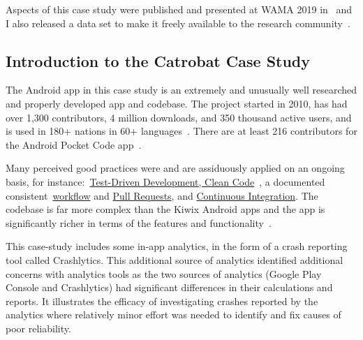 Aspects of this case study were published and presented at WAMA 2019 in~\citep{harty_better_android_apps_using_android_vitals} and I also released a data set to make it freely available to the research community~\citep{harty_wama_dataset_examples}. 
 


\subsection{Introduction to the Catrobat Case Study}

The Android app in this case study is an extremely and unusually well researched and properly developed app and codebase. The project started in 2010, has had over 1,300 contributors, 4 million downloads, and 350 thousand active users, and is used in 180+ nations in 60+ languages~\citep{catrobat_project}. There are at least 216 contributors for the Android Pocket Code app~\citep{github_catroid}.

Many perceived good practices were and are assiduously applied on an ongoing basis, for instance:~\href{https://github.com/Catrobat/Catroid}{Test-Driven Development, Clean Code}~\citep{catrobat_first_steps_into}, a documented consistent~\href{https://github.com/Catrobat/Catroid/wiki/Workflow}{workflow} and \href{https://github.com/Catrobat/Catroid/wiki/Creating-a-pull-request}{Pull Requests}, and \href{https://jenkins.catrob.at/job/Catroid/}{Continuous Integration}. The codebase is far more complex than the Kiwix Android apps and the app is significantly richer in terms of the features and functionality~\citep{mueller2019_pocketcode}.

This case-study includes some in-app analytics, in the form of a crash reporting tool called Crashlytics. This additional source of analytics identified additional concerns with analytics tools as the two sources of analytics (Google Play Console and Crashlytics) had significant differences in their calculations and reports. It illustrates the efficacy of investigating crashes reported by the analytics where relatively minor effort was needed to identify and fix causes of poor reliability.

